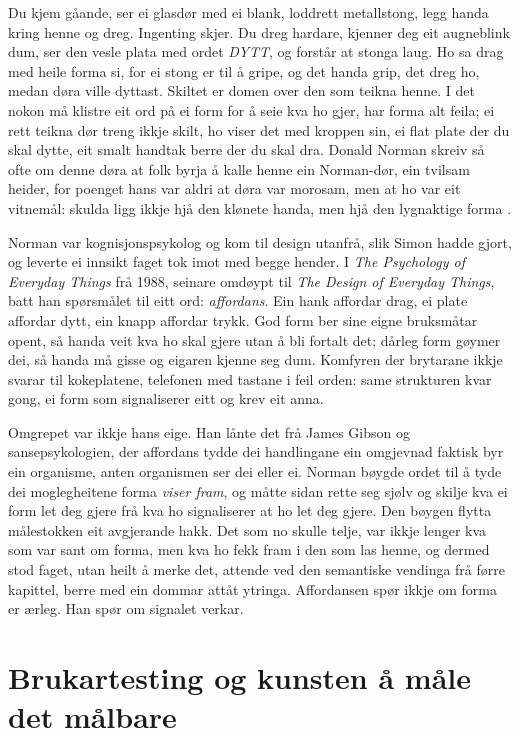 Du kjem gåande, ser ei glasdør med ei blank, loddrett metallstong, legg handa kring henne og dreg. Ingenting skjer. Du dreg hardare, kjenner deg eit augneblink dum, ser den vesle plata med ordet \emph{DYTT}, og forstår at stonga laug. Ho sa drag med heile forma si, for ei stong er til å gripe, og det handa grip, det dreg ho, medan døra ville dyttast. Skiltet er domen over den som teikna henne. I det nokon må klistre eit ord på ei form for å seie kva ho gjer, har forma alt feila; ei rett teikna dør treng ikkje skilt, ho viser det med kroppen sin, ei flat plate der du skal dytte, eit smalt handtak berre der du skal dra. Donald Norman skreiv så ofte om denne døra at folk byrja å kalle henne ein Norman-dør, ein tvilsam heider, for poenget hans var aldri at døra var morosam, men at ho var eit vitnemål: skulda ligg ikkje hjå den klønete handa, men hjå den lygnaktige forma \autocite{norman2013}.

Norman var kognisjonspsykolog og kom til design utanfrå, slik Simon hadde gjort, og leverte ei innsikt faget tok imot med begge hender. I \textit{The Psychology of Everyday Things} frå 1988, seinare omdøypt til \textit{The Design of Everyday Things}, batt han spørsmålet til eitt ord: \emph{affordans}. Ein hank affordar drag, ei plate affordar dytt, ein knapp affordar trykk. God form ber sine eigne bruksmåtar opent, så handa veit kva ho skal gjere utan å bli fortalt det; dårleg form gøymer dei, så handa må gisse og eigaren kjenne seg dum. Komfyren der brytarane ikkje svarar til kokeplatene, telefonen med tastane i feil orden: same strukturen kvar gong, ei form som signaliserer eitt og krev eit anna.

Omgrepet var ikkje hans eige. Han lånte det frå James Gibson og sansepsykologien, der affordans tydde dei handlingane ein omgjevnad faktisk byr ein organisme, anten organismen ser dei eller ei. Norman bøygde ordet til å tyde dei moglegheitene forma \emph{viser fram}, og måtte sidan rette seg sjølv og skilje kva ei form let deg gjere frå kva ho signaliserer at ho let deg gjere. Den bøygen flytta målestokken eit avgjerande hakk. Det som no skulle telje, var ikkje lenger kva som var sant om forma, men kva ho fekk fram i den som las henne, og dermed stod faget, utan heilt å merke det, attende ved den semantiske vendinga frå førre kapittel, berre med ein dommar attåt ytringa. Affordansen spør ikkje om forma er ærleg. Han spør om signalet verkar.

\section{Brukartesting og kunsten å måle det målbare}

